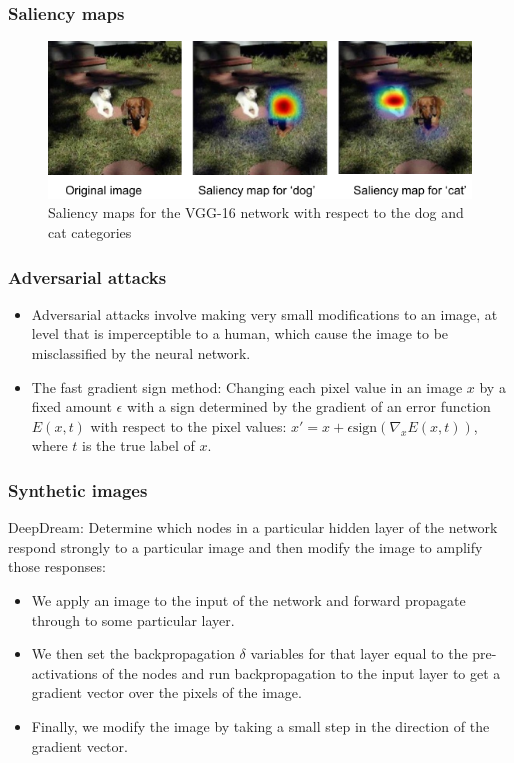 \documentclass{beamer}
\begin{document}
\begin{frame}
    \frametitle{Saliency maps}
    \begin{figure}
        \caption{Saliency maps for the VGG-16 network with respect to the dog and cat categories}
        \includegraphics{Figure_15.pdf}
    \end{figure}
\end{frame}

\begin{frame}
    \frametitle{Adversarial attacks}
    \begin{itemize}
        \item Adversarial attacks involve making very small modifications to an image, at level that is imperceptible to a human, which cause the image to be misclassified by the neural network.
        \item The fast gradient sign method: Changing each pixel value in an image $x$ by a fixed amount $\epsilon$ with a sign determined by the gradient of an error function $E(x,t)$ with respect to the pixel values: $x'=x+\epsilon\mathrm{sign}(\nabla_{x}E(x,t))$, where $t$ is the true label of $x$.
    \end{itemize}
\end{frame}

\begin{frame}
    \frametitle{Synthetic images}
    DeepDream: Determine which nodes in a particular hidden layer of the network respond strongly to a particular image and then modify the image to amplify those responses:
    \begin{itemize}
        \item We apply an image to the input of the network and forward propagate through to some particular layer.
        \item We then set the backpropagation $\delta$ variables for that layer equal to the pre-activations of the nodes and run backpropagation to the input layer to get a gradient vector over the pixels of the image.
        \item Finally, we modify the image by taking a small step in the direction of the gradient vector.
    \end{itemize}
\end{frame}
\end{document}
